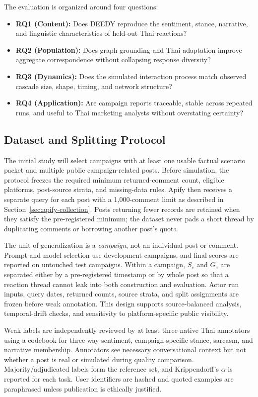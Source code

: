 \documentclass[conference]{IEEEtran}
\begin{document}
The evaluation is organized around four questions:
\begin{itemize}
    \item \textbf{RQ1 (Content):} Does DEEDY reproduce the sentiment, stance,
    narrative, and linguistic characteristics of held-out Thai reactions?
    \item \textbf{RQ2 (Population):} Does graph grounding and Thai adaptation
    improve aggregate correspondence without collapsing response diversity?
    \item \textbf{RQ3 (Dynamics):} Does the simulated interaction process match
    observed cascade size, shape, timing, and network structure?
    \item \textbf{RQ4 (Application):} Are campaign reports traceable, stable
    across repeated runs, and useful to Thai marketing analysts without
    overstating certainty?
\end{itemize}

\subsection{Dataset and Splitting Protocol}

The initial study will select campaigns with at least one usable factual
scenario packet and multiple public campaign-related posts. Before simulation,
the protocol freezes the required minimum returned-comment count, eligible
platforms, post-source strata, and missing-data rules. Apify then receives a
separate query for each post with a 1,000-comment limit as described in
Section~\ref{sec:apify-collection}. Posts returning fewer records are retained
when they satisfy the pre-registered minimum; the dataset never pads a short
thread by duplicating comments or borrowing another post's quota.

The unit of generalization is a \emph{campaign}, not an individual post or
comment. Prompt and model selection use development campaigns, and final
scores are reported on untouched test campaigns. Within a campaign, $S_e$ and
$G_e$ are separated either by a pre-registered timestamp or by whole post so
that a reaction thread cannot leak into both construction and evaluation.
Actor run inputs, query dates, returned counts, source strata, and split
assignments are frozen before weak annotation. This design supports
source-balanced analysis, temporal-drift checks, and sensitivity to
platform-specific public visibility.

Weak labels are independently reviewed by at least three native Thai
annotators using a codebook for three-way sentiment, campaign-specific stance,
sarcasm, and narrative membership. Annotators see necessary conversational
context but not whether a post is real or simulated during quality comparison.
Majority/adjudicated labels form the reference set, and Krippendorff's
$\alpha$ is reported for each task. User identifiers are hashed and quoted
examples are paraphrased unless publication is ethically justified.
\end{document}
